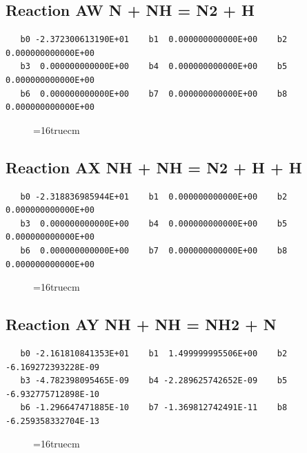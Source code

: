 \documentclass[12pt,dvipdfm]{article}
\begin{document}
\subsection{
Reaction AW N + NH = N2 + H}
\begin{small}\begin{verbatim}
   b0 -2.372300613190E+01    b1  0.000000000000E+00    b2  0.000000000000E+00
   b3  0.000000000000E+00    b4  0.000000000000E+00    b5  0.000000000000E+00
   b6  0.000000000000E+00    b7  0.000000000000E+00    b8  0.000000000000E+00
   \end{verbatim}\end{small}
\begin{figure}[h!]
\label{n2rates}
\epsfxsize=16truecm
\end{figure}
\newpage

\subsection{
Reaction AX NH + NH = N2 + H + H}
\begin{small}\begin{verbatim}
   b0 -2.318836985944E+01    b1  0.000000000000E+00    b2  0.000000000000E+00
   b3  0.000000000000E+00    b4  0.000000000000E+00    b5  0.000000000000E+00
   b6  0.000000000000E+00    b7  0.000000000000E+00    b8  0.000000000000E+00
   \end{verbatim}\end{small}
\begin{figure}[h!]
\label{n2rates}
\epsfxsize=16truecm
\end{figure}
\newpage

\subsection{
Reaction AY NH + NH = NH2 + N}
\begin{small}\begin{verbatim}
   b0 -2.161810841353E+01    b1  1.499999995506E+00    b2 -6.169272393228E-09
   b3 -4.782398095465E-09    b4 -2.289625742652E-09    b5 -6.932775712898E-10
   b6 -1.296647471885E-10    b7 -1.369812742491E-11    b8 -6.259358332704E-13
   \end{verbatim}\end{small}
\begin{figure}[h!]
\label{n2rates}
\epsfxsize=16truecm
\end{figure}
\newpage
\end{document}
